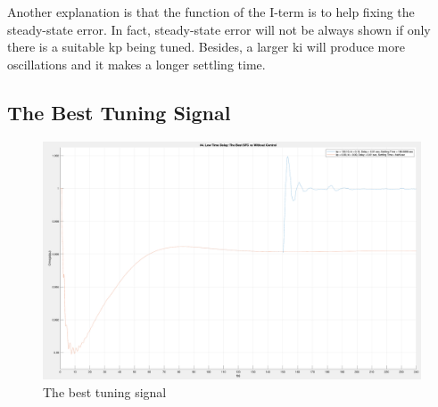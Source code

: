 Another explanation is that the function of the I-term is to help fixing the steady-state error. In fact, steady-state error will not be always shown if only there is a suitable kp being tuned. Besides, a larger ki will produce more oscillations and it makes a longer settling time. \\


\subsection{The Best Tuning Signal} %

\begin{figure}[htbp]
\centering
\includegraphics[width = .819\textwidth]{figure/4_4_2_best.png}
\caption{The best tuning signal}
\label{4_4_2_best}
\end{figure}